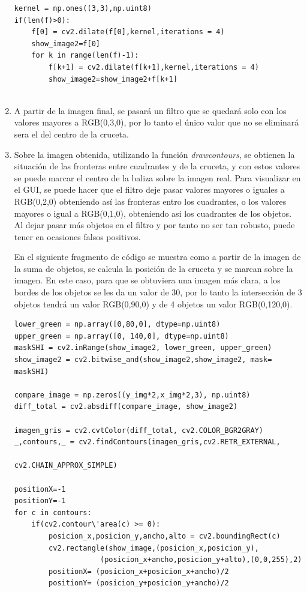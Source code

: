 \begin{enumerate}
\begin{lstlisting}[backgroundcolor=\color{yellow}]
kernel = np.ones((3,3),np.uint8)
if(len(f)>0):
    f[0] = cv2.dilate(f[0],kernel,iterations = 4)
    show_image2=f[0]
    for k in range(len(f)-1):
        f[k+1] = cv2.dilate(f[k+1],kernel,iterations = 4)
        show_image2=show_image2+f[k+1]
		
\end{lstlisting}


	\item A partir de la imagen final, se pasar\'a un filtro que se quedar\'a solo con los valores mayores a RGB(0,3,0), por lo tanto el \'unico valor que no se eliminar\'a sera el del centro de la cruceta.

	\item Sobre la imagen obtenida, utilizando la funci\'on \textit{drawcontours}, se obtienen la situaci\'on de las fronteras entre cuadrantes y de la cruceta, y con estos valores se puede marcar el centro de la baliza sobre la imagen real. Para visualizar en el GUI, se puede hacer que el filtro deje pasar valores mayores o iguales a RGB(0,2,0) obteniendo as\'i las fronteras entro los cuadrantes, o los valores mayores o igual a RGB(0,1,0), obteniendo asi los cuadrantes de los objetos. Al dejar pasar m\'as objetos en el filtro y por tanto no ser tan robusto, puede tener en ocasiones falsos positivos.

\hspace{1 cm}En el siguiente fragmento de c\'odigo se muestra como a partir de la imagen de la suma de objetos, se calcula la posici\'on de la cruceta y se marcan sobre la imagen. En este caso, para que se obtuviera una imagen m\'as clara, a los bordes de los objetos se les da un valor de 30, por lo tanto la intersecci\'on de 3 objetos tendr\'a un valor RGB(0,90,0) y de 4 objetos un valor RGB(0,120,0).

\begin{lstlisting}[backgroundcolor=\color{yellow}]
lower_green = np.array([0,80,0], dtype=np.uint8) 
upper_green = np.array([0, 140,0], dtype=np.uint8) 
maskSHI = cv2.inRange(show_image2, lower_green, upper_green)
show_image2 = cv2.bitwise_and(show_image2,show_image2, mask= maskSHI)

compare_image = np.zeros((y_img*2,x_img*2,3), np.uint8)
diff_total = cv2.absdiff(compare_image, show_image2)

imagen_gris = cv2.cvtColor(diff_total, cv2.COLOR_BGR2GRAY)
_,contours,_ = cv2.findContours(imagen_gris,cv2.RETR_EXTERNAL, 
                                             cv2.CHAIN_APPROX_SIMPLE)

positionX=-1
positionY=-1
for c in contours:
    if(cv2.contour\'area(c) >= 0):
        posicion_x,posicion_y,ancho,alto = cv2.boundingRect(c) 
        cv2.rectangle(show_image,(posicion_x,posicion_y),
                    (posicion_x+ancho,posicion_y+alto),(0,0,255),2)
        positionX= (posicion_x+posicion_x+ancho)/2
        positionY= (posicion_y+posicion_y+ancho)/2
\end{lstlisting}

\end{enumerate}

